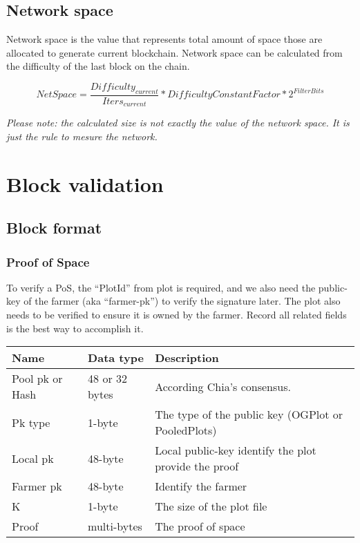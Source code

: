\subsection{Network space}
\begin{flushleft}
    Network space is the value that represents total amount of space those are allocated to generate current blockchain. Network space can be calculated from the difficulty of the last block on the chain.
\end{flushleft}
\begin{equation}
    NetSpace = \frac{Difficulty_{current}}{Iters_{current}}*{DifficultyConstantFactor}*2^{FilterBits}
\end{equation}
\begin{flushleft}
    \textit{Please note: the calculated size is not exactly the value of the network space. It is just the rule to mesure the network.}
\end{flushleft}
\section{Block validation}
\subsection{Block format}
\subsubsection{Proof of Space}
\begin{flushleft}
    To verify a PoS, the ``PlotId'' from plot is required, and we also need the public-key of the farmer (aka ``farmer-pk'') to verify the signature later. The plot also needs to be verified to ensure it is owned by the farmer. Record all related fields is the best way to accomplish it.
\end{flushleft}
\begin{tabular}{ |p{3cm}|p{3cm}|p{6cm}| }
    \hline
    \rowcolor{lightgray}\textbf{Name} & \textbf{Data type} & \textbf{Description} \\[5pt]
    \hline
    Pool pk or Hash & 48 or 32 bytes & According Chia's consensus.\\[5pt]
    \rowcolor{lightgray!30} Pk type & 1-byte & The type of the public key (OGPlot or PooledPlots) \\[5pt]
    Local pk & 48-byte & Local public-key identify the plot provide the proof \\[5pt]
    \rowcolor{lightgray!30} Farmer pk & 48-byte & Identify the farmer \\[5pt]
    K & 1-byte & The size of the plot file \\[5pt]
    \rowcolor{lightgray!30} Proof & multi-bytes & The proof of space \\[5pt]
    \hline
\end{tabular}
